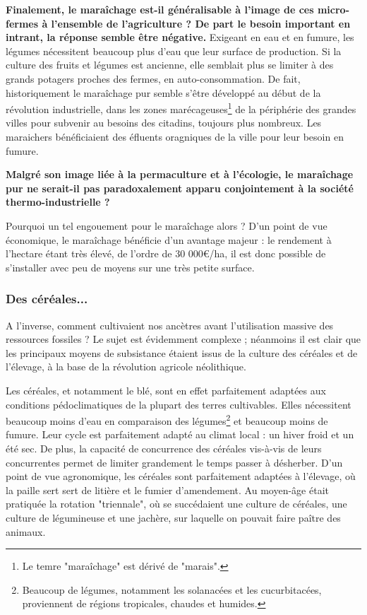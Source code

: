 \documentclass{book}
\begin{document}
\textbf{Finalement, le maraîchage est-il généralisable à l'image de ces micro-fermes à l'ensemble de l'agriculture ? De part le besoin important en intrant, la réponse semble être négative.} Exigeant en eau et en fumure, les légumes nécessitent beaucoup plus d'eau que leur surface de production. Si la culture des fruits et légumes est ancienne, elle semblait plus se limiter à des grands potagers proches des fermes, en auto-consommation. De fait, historiquement le maraîchage pur semble s'être développé au début de la révolution industrielle, dans les zones marécageuses\footnote{Le temre "maraîchage" est dérivé de "marais".} de la périphérie des grandes villes pour subvenir au besoins des citadins, toujours plus nombreux. Les maraichers bénéficiaient des éfluents oragniques de la ville pour leur besoin en fumure. 

\textbf{Malgré son image liée à la permaculture et à l'écologie, le maraîchage pur ne serait-il pas paradoxalement apparu conjointement à la société thermo-industrielle ?}

Pourquoi un tel engouement pour le maraîchage alors ? D'un point de vue économique, le maraîchage bénéficie d'un avantage majeur : le rendement à l'hectare étant très élevé, de l'ordre de 30 000\euro{}/ha, il est donc possible de s'installer avec peu de moyens sur une très petite surface. 

\subsubsection{Des céréales...}

A l'inverse, comment cultivaient nos ancètres avant l'utilisation massive des ressources fossiles ? Le sujet est évidemment complexe ; néanmoins il est clair que les principaux moyens de subsistance étaient issus de la culture des céréales et de l'élevage, à la base de la révolution agricole néolithique.

Les céréales, et notamment le blé, sont en effet parfaitement adaptées aux conditions pédoclimatiques de la plupart des terres cultivables. Elles nécessitent beaucoup moins d'eau en comparaison des légumes\footnote{Beaucoup de légumes, notamment les solanacées et les cucurbitacées, proviennent de régions tropicales, chaudes et humides.} et beaucoup moins de fumure. Leur cycle est parfaitement adapté au climat local : un hiver froid et un été sec. De plus, la capacité de concurrence des céréales vis-à-vis de leurs concurrentes permet de limiter grandement le temps passer à désherber. D'un point de vue agronomique, les céréales sont parfaitement adaptées à l'élevage, où la paille sert sert de litière et le fumier d'amendement. Au moyen-âge était pratiquée la rotation "triennale", où se succédaient une culture de céréales, une culture de légumineuse et une jachère, sur laquelle on pouvait faire paître des animaux.
\end{document}
